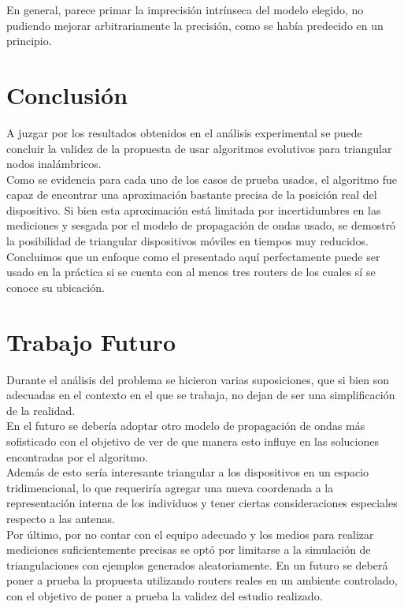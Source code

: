 \documentclass[journal]{IEEEtran}
\begin{document}
En general, parece primar la imprecisión intrínseca del modelo elegido, no pudiendo mejorar arbitrariamente la precisión, como se había predecido en un principio.\\

\section{Conclusión}

A juzgar por los resultados obtenidos en el análisis experimental se puede concluir la validez de la propuesta de usar algoritmos evolutivos para triangular nodos inalámbricos.\\

Como se evidencia para cada uno de los casos de prueba usados, el algoritmo fue capaz de encontrar una aproximación bastante precisa de la posición real del dispositivo. Si bien esta aproximación está limitada por incertidumbres en las mediciones y sesgada por el modelo de propagación de ondas usado, se demostró la posibilidad de triangular dispositivos móviles en tiempos muy reducidos.\\

Concluimos que un enfoque como el presentado aquí perfectamente puede ser usado en la práctica si se cuenta con al menos tres routers de los cuales sí se conoce su ubicación.\\

\section{Trabajo Futuro}

Durante el análisis del problema se hicieron varias suposiciones, que si bien son adecuadas en el contexto en el que se trabaja, no dejan de ser una simplificación de la realidad.\\

En el futuro se debería adoptar otro modelo de propagación de ondas más sofisticado con el objetivo de ver de que manera esto influye en las soluciones encontradas por el algoritmo.\\

Además de esto sería interesante triangular a los dispositivos en un espacio tridimencional, lo que requeriría agregar una nueva coordenada a la representación interna de los individuos y tener ciertas consideraciones especiales respecto a las antenas.\\

Por último, por no contar con el equipo adecuado y los medios para realizar mediciones suficientemente precisas se optó por limitarse a la simulación de triangulaciones con ejemplos generados aleatoriamente. En un futuro se deberá poner a prueba la propuesta utilizando routers reales en un ambiente controlado, con el objetivo de poner a prueba la validez del estudio realizado.\\
\end{document}

